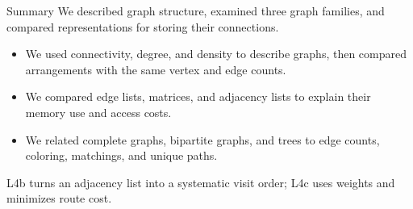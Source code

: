 \documentclass[aspectratio=169,11pt]{beamer}
\begin{document}
\begin{frame}{Summary}
  We described graph structure, examined three graph families, and compared
  representations for storing their connections.

  \vspace{0.7em}
  {\large\textbf{}}
  \vspace{0.35em}
  \begin{itemize}\setlength{\itemsep}{0.6em}
    \item \textbf{} We used connectivity,
      degree, and density to describe graphs, then compared arrangements with
      the same vertex and edge counts.
    \item \textbf{} We compared edge lists, matrices,
      and adjacency lists to explain their memory use and access costs.
    \item \textbf{} We related complete graphs, bipartite
      graphs, and trees to edge counts, coloring, matchings, and unique paths.
  \end{itemize}

  \vspace{0.5em}
  L4b turns an adjacency list into a systematic visit order; L4c uses weights
  and minimizes route cost.
\end{frame}

\end{document}
